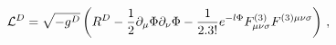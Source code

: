 \begin{equation}
   \label{Bth}
  {\cal L}^D =\sqrt{-g^D}\left(R^D-
\frac{1}{2}\partial_\mu\Phi\partial_\nu\Phi-{1\over 2 . 3!
}e^{-l\Phi}F^{(3)}_{\mu\nu\sigma}F^{(3)\mu\nu\sigma}\right)\, ,
\end{equation} 
